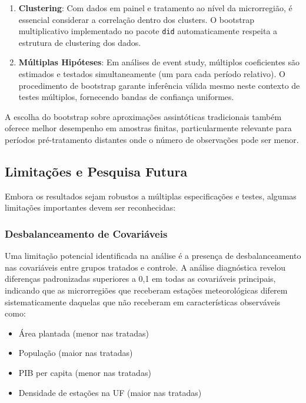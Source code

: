 \documentclass[
	12pt,				%
	oneside,			%
	a4paper,			%
	english,			%
	french,				%
	spanish,			%
	brazil				%
	]{abntex2}
\begin{document}
\begin{enumerate}
\item \textbf{Clustering}: Com dados em painel e tratamento ao nível da microrregião, é essencial considerar a correlação dentro dos clusters. O bootstrap multiplicativo implementado no pacote \texttt{did} automaticamente respeita a estrutura de clustering dos dados.

\item \textbf{Múltiplas Hipóteses}: Em análises de event study, múltiplos coeficientes são estimados e testados simultaneamente (um para cada período relativo). O procedimento de bootstrap garante inferência válida mesmo neste contexto de testes múltiplos, fornecendo bandas de confiança uniformes.
\end{enumerate}

A escolha do bootstrap sobre aproximações assintóticas tradicionais também oferece melhor desempenho em amostras finitas, particularmente relevante para períodos pré-tratamento distantes onde o número de observações pode ser menor.

\subsection{Limitações e Pesquisa Futura}

Embora os resultados sejam robustos a múltiplas especificações e testes, algumas limitações importantes devem ser reconhecidas:

\subsubsection{Desbalanceamento de Covariáveis}

Uma limitação potencial identificada na análise é a presença de desbalanceamento nas covariáveis entre grupos tratados e controle. A análise diagnóstica revelou diferenças padronizadas superiores a 0,1 em todas as covariáveis principais, indicando que as microrregiões que receberam estações meteorológicas diferem sistematicamente daquelas que não receberam em características observáveis como:

\begin{itemize}
\item Área plantada (menor nas tratadas)
\item População (maior nas tratadas)
\item PIB per capita (menor nas tratadas)
\item Densidade de estações na UF (maior nas tratadas)
\end{itemize}
\end{document}

